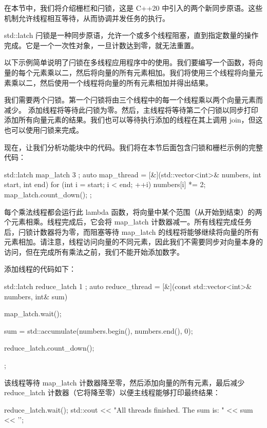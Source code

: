 在本节中，我们将介绍栅栏和闩锁，这是 C++20 中引入的两个新同步原语。这些机制允许线程相互等待，从而协调并发任务的执行。


std::latch 闩锁是一种同步原语，允许一个或多个线程阻塞，直到指定数量的操作完成。它是一个一次性对象，一旦计数达到零，就无法重置。

以下示例简单说明了闩锁在多线程应用程序中的使用。我们要编写一个函数，将向量的每个元素乘以二，然后将向量的所有元素相加。我们将使用三个线程将向量元素乘以二，然后使用一个线程将向量的所有元素相加并得出结果。

我们需要两个闩锁。第一个闩锁将由三个线程中的每一个线程乘以两个向量元素而减少。
添加线程将等待此闩锁为零。然后，主线程将等待第二个闩锁以同步打印添加所有向量元素的结果。我们也可以等待执行添加的线程在其上调用 join，但这也可以使用闩锁来完成。

现在，让我们分析功能块中的代码。我们将在本节后面包含闩锁和栅栏示例的完整代码：

\begin{cpp}
std::latch map_latch{ 3 };
auto map_thread = [&](std::vector<int>& numbers, int start, int end) {
    for (int i = start; i < end; ++i) {
        numbers[i] *= 2;
    }
    map_latch.count_down();
};
\end{cpp}

每个乘法线程都会运行此 lambda 函数，将向量中某个范围（从开始到结束）的两个元素相乘。线程完成后，它会将 map\_latch 计数器减一。所有线程完成任务后，闩锁计数器将为零，而阻塞等待 map\_latch 的线程将能够继续将向量的所有元素相加。请注意，线程访问向量的不同元素，因此我们不需要同步对向量本身的访问，但在完成所有乘法之前，我们不能开始添加数字。

添加线程的代码如下：

\begin{cpp}
std::latch reduce_latch{ 1 };
auto reduce_thread = [&](const std::vector<int>& numbers, int& sum) {
    map_latch.wait();

    sum = std::accumulate(numbers.begin(), numbers.end(), 0);

    reduce_latch.count_down();
};
\end{cpp}

该线程等待 map\_latch 计数器降至零，然后添加向量的所有元素，最后减少 reduce\_latch 计数器（它将降至零）以便主线程能够打印最终结果：

\begin{cpp}
reduce_latch.wait();
std::cout << "All threads finished. The sum is: " << sum << '\n';
\end{cpp}

